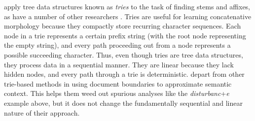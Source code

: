 \cite{moon-et-al:2009} apply tree data structures known as \textit{tries} to the task of finding stems and affixes, as have a number of other researchers \citep[e.g.,][]{schone-and-jurafsky:2000, monson:2004, argamon:2004}.
Tries are useful for learning concatenative morphology because they compactly store recurring character sequences.
Each node in a trie represents a certain prefix string (with the root node representing the empty string), 
and every path proceeding out from a node represents a possible succeeding character. 
Thus, even though tries are tree data structures, they process data in a sequential manner. 
They 
are linear
because they lack hidden nodes, and every path through a trie is deterministic. 
 \cite{moon-et-al:2009} depart from other trie-based methods in using document 
 boundaries to approximate semantic context. 
 This helps them weed out spurious analyses like the \textit{disturbanc}+\textit{e} 
 example above, but it does not change the fundamentally sequential and linear nature of their approach.
%

